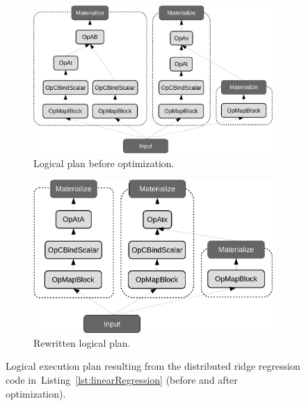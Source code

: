 \documentclass{article}
\begin{document}
\begin{figure}
    \centering
         \begin{subfigure}[b]{0.5\textwidth}
            \centering
            \includegraphics[scale=.33]{figures/linear-regression-logicalplan-crop}
            \caption{Logical plan before optimization.}
            \label{fig:logicalplan}
        \end{subfigure}
  \hfill
         \begin{subfigure}[b]{0.4\textwidth}
            \centering
            \includegraphics[scale=.33]{figures/linear-regression-logicalplan-optimized-crop}
            \caption{Rewritten logical plan.}
            \label{fig:logicalplan-optimized}
        \end{subfigure}
        \caption{\label{fig:logicalplans} Logical execution plan resulting from the distributed ridge regression code in~Listing~\ref{lst:linearRegression} (before and after optimization).}
\end{figure}
\end{document}
